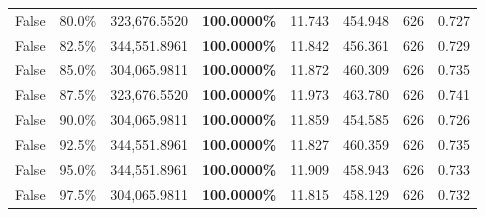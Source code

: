 \begin{table}[H]
\begin{tabular}{lllrllll}
\cline{1-8}
False & 80.0\% & 323,676.5520 & \bfseries \color{red} 100.0000\% & 11.743 & 454.948 & 626 & 0.727 \\
\cline{1-8}
False & 82.5\% & 344,551.8961 & \bfseries \color{red} 100.0000\% & 11.842 & 456.361 & 626 & 0.729 \\
\cline{1-8}
False & 85.0\% & \color{red} 304,065.9811 & \bfseries \color{red} 100.0000\% & 11.872 & 460.309 & 626 & 0.735 \\
\cline{1-8}
False & 87.5\% & 323,676.5520 & \bfseries \color{red} 100.0000\% & 11.973 & 463.780 & 626 & 0.741 \\
\cline{1-8}
False & 90.0\% & \color{red} 304,065.9811 & \bfseries \color{red} 100.0000\% & 11.859 & 454.585 & 626 & 0.726 \\
\cline{1-8}
False & 92.5\% & 344,551.8961 & \bfseries \color{red} 100.0000\% & 11.827 & 460.359 & 626 & 0.735 \\
\cline{1-8}
False & 95.0\% & 344,551.8961 & \bfseries \color{red} 100.0000\% & 11.909 & 458.943 & 626 & 0.733 \\
\cline{1-8}
False & 97.5\% & \color{red} 304,065.9811 & \bfseries \color{red} 100.0000\% & 11.815 & 458.129 & 626 & 0.732 \\
\cline{1-8}
\bottomrule
\end{tabular}
\end{table}
